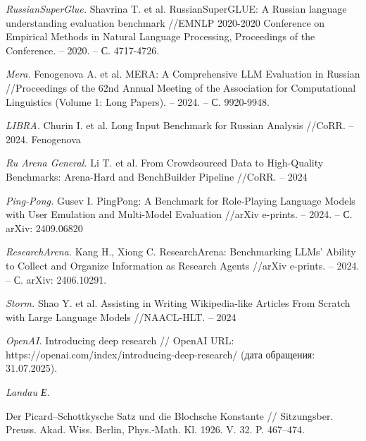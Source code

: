 \documentclass{article}
\theoremstyle{definition}
\theoremstyle{plain}
\begin{document}
\begin{thebibliography}{99}

\textit{RussianSuperGlue.}
Shavrina T. et al. RussianSuperGLUE: A Russian language understanding evaluation benchmark //EMNLP 2020-2020 Conference on Empirical Methods in Natural Language Processing, Proceedings of the Conference. – 2020. – С. 4717-4726.

\textit{Mera.}
Fenogenova A. et al. MERA: A Comprehensive LLM Evaluation in Russian //Proceedings of the 62nd Annual Meeting of the Association for Computational Linguistics (Volume 1: Long Papers). – 2024. – С. 9920-9948.

\textit{LIBRA.}
Churin I. et al. Long Input Benchmark for Russian Analysis //CoRR. – 2024. Fenogenova 

\textit{Ru Arena General.}
Li T. et al. From Crowdsourced Data to High-Quality Benchmarks: Arena-Hard and BenchBuilder Pipeline //CoRR. – 2024

\textit{Ping-Pong.}
Gusev I. PingPong: A Benchmark for Role-Playing Language Models with User Emulation and Multi-Model Evaluation //arXiv e-prints. – 2024. – С. arXiv: 2409.06820

\textit{ResearchArena.}
Kang H., Xiong C. ResearchArena: Benchmarking LLMs' Ability to Collect and Organize Information as Research Agents //arXiv e-prints. – 2024. – С. arXiv: 2406.10291.

\textit{Storm.}
Shao Y. et al. Assisting in Writing Wikipedia-like Articles From Scratch with Large Language Models //NAACL-HLT. – 2024

\textit{OpenAI.}
Introducing deep research // OpenAI URL: https://openai.com/index/introducing-deep-research/ (дата обращения: 31.07.2025).

\textit{Landau Е.}

Der Picard--Schottkysche Satz und die Blochsche Konstante //
Sitzungsber. Preuss. Akad. Wiss. Berlin, Phys.-Math. Kl. 1926. V. 32. P. 467--474.

\end{thebibliography}
\end{document}
